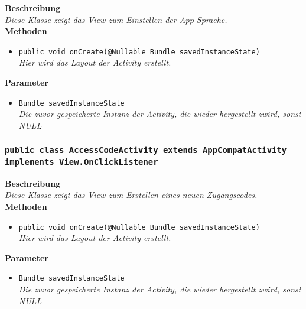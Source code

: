 	\textbf{Beschreibung} \\
	\textit{Diese Klasse zeigt das View zum Einstellen der App-Sprache.} \\

	\textbf{Methoden}
	\begin{itemize}
		\item\texttt{{public void onCreate(@Nullable Bundle savedInstanceState)}}\\
	\textit{Hier wird das Layout der Activity erstellt.}\\
	\end{itemize}

	\textbf{Parameter}
	\begin{itemize}
		\item\texttt{Bundle savedInstanceState}\\  
	\textit{Die zuvor gespeicherte Instanz der Activity, die wieder hergestellt zwird, sonst NULL}\\
	\end{itemize} 

\subsubsection{\texttt{public class AccessCodeActivity extends AppCompatActivity implements View.OnClickListener}}

\textbf{Beschreibung} \\
\textit{Diese Klasse zeigt das View zum Erstellen eines neuen Zugangscodes.} \\

\textbf{Methoden}
\begin{itemize}
	\item\texttt{{public void onCreate(@Nullable Bundle savedInstanceState)}}\\
	\textit{Hier wird das Layout der Activity erstellt.}\\
\end{itemize}

\textbf{Parameter}
\begin{itemize}
	\item\texttt{Bundle savedInstanceState}\\  
	\textit{Die zuvor gespeicherte Instanz der Activity, die wieder hergestellt zwird, sonst NULL}\\
\end{itemize} 

\newpage
